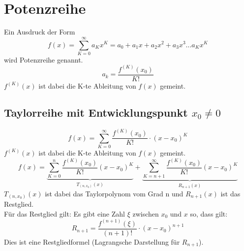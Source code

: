 



\section{Potenzreihe}
Ein Ausdruck der Form 
\[ \boxed{f(x) = \sum_{K = 0}^{\infty} a_K x^K = a_0 + a_1 x + a_2 x^2 + a_3 x^3 \dots a_K x^K} \]
wird Potenzreihe genannt. 
\[ \boxed{a_k = \frac{f^{(K)}(x_0)}{K!}} \]
$f^{(K)}(x)$ ist dabei die K-te Ableitung von $f(x)$ gemeint. 

\subsection{Taylorreihe mit Entwicklungspunkt $x_0 \neq 0$}
\[ \boxed{f(x) = \sum_{K=0}^{\infty}\frac{f^{(K)}(x_0)}{K!}\cdot (x-x_0)^K} \]
$f^{(K)}(x)$ ist dabei die K-te Ableitung von $f(x)$ gemeint. 
\[ \boxed{f(x) = \underbrace{\sum_{K=0}^{n}\frac{f^{(K)}(x_0)}{K!} (x - x_0)^K}_{T_{(n,x_0)}(x)} + \underbrace{\sum_{K=n+1}^{\infty}\frac{f^{(K)}(x_0)}{K!} (x - x_0)^K}_{R_{n+1}(x)}} \]
$T_{(n,x_0)}(x)$ ist dabei das Taylorpolynom vom Grad n und $R_{n+1}(x)$ ist das Restglied. \\
Für das Restglied gilt: Es gibt eine Zahl $\xi$ zwischen $x_0$ und $x$ so, dass gilt:
\[ \boxed{R_{n+1} = \frac{f^{(n + 1)}(\xi)}{(n + 1)!} \cdot (x - x_0)^{n + 1}} \]
Dies ist eine Restgliedformel (Lagrangsche Darstellung für $R_{n + 1}$).

